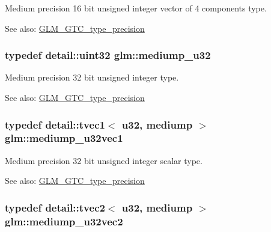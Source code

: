 Medium precision 16 bit unsigned integer vector of 4 components type. \begin{Desc}
\item[See also:]\hyperlink{group__gtc__type__precision}{GLM\_\-GTC\_\-type\_\-precision} \end{Desc}
\hypertarget{group__gtc__type__precision_gd0c27a525045c299a92306eb4cd7c13a}{
\subsubsection[mediump\_\-u32]{\setlength{\rightskip}{0pt plus 5cm}typedef detail::uint32 {\bf glm::mediump\_\-u32}}}
\label{group__gtc__type__precision_gd0c27a525045c299a92306eb4cd7c13a}


Medium precision 32 bit unsigned integer type. \begin{Desc}
\item[See also:]\hyperlink{group__gtc__type__precision}{GLM\_\-GTC\_\-type\_\-precision} \end{Desc}
\hypertarget{group__gtc__type__precision_g323fb0ed8f492d918b087226db2994f3}{
\subsubsection[mediump\_\-u32vec1]{\setlength{\rightskip}{0pt plus 5cm}typedef detail::tvec1$<$ u32, mediump $>$ {\bf glm::mediump\_\-u32vec1}}}
\label{group__gtc__type__precision_g323fb0ed8f492d918b087226db2994f3}


Medium precision 32 bit unsigned integer scalar type. \begin{Desc}
\item[See also:]\hyperlink{group__gtc__type__precision}{GLM\_\-GTC\_\-type\_\-precision} \end{Desc}
\hypertarget{group__gtc__type__precision_g5d16ea7e110d8ba923ca347c16704f88}{
\subsubsection[mediump\_\-u32vec2]{\setlength{\rightskip}{0pt plus 5cm}typedef detail::tvec2$<$ u32, mediump $>$ {\bf glm::mediump\_\-u32vec2}}}
\label{group__gtc__type__precision_g5d16ea7e110d8ba923ca347c16704f88}


